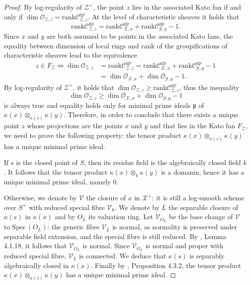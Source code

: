 \documentclass{amsart}%
\numberwithin{equation}{subsection}
\theoremstyle{plain2}
\theoremstyle{definition2}
\theoremstyle{stepstyle}
\theoremstyle{point}
\theoremstyle{subpoint}
\newcommand{\cX}{\ensuremath{\mathscr{X}}}
\newcommand{\fp}{\ensuremath{\mathfrak{p}}}
\newcommand{\caC}{\ensuremath{\mathcal{C}}}
\newcommand{\caO}{\ensuremath{\mathcal{O}}}
\newcommand{\cY}{\ensuremath{\mathscr{Y}}}
\newcommand{\cZ}{\ensuremath{\mathscr{Z}}}
\renewcommand{\cZ}{\ensuremath{\mathscr{Z}}}
\renewcommand{\cY}{\ensuremath{\mathscr{Y}}}
\newcommand{\Spec}{\ensuremath{\mathrm{Spec}\,}}
\newcommand{\rank}{\mathrm{rank}}
\begin{document}
\begin{proof}
By log-regularity of $\cZ^+$, the point $z$ lies in the associated Kato fan if and only if $\dim \caO_{\cZ,z}= \rank \caC_{\cZ,z}^{\text{gp}}$. At the level of characteristic sheaves it holds that $$\rank \caC_{\cZ,z}^{\text{gp}}= \rank \caC_{\cX,x}^{\text{gp}} + \rank \caC_{\cY,y}^{\text{gp}} - 1.$$ Since $x$ and $y$ are both assumed to be points in the associated Kato fans, the equality between dimension of local rings and rank of the groupifications of characteristic sheaves lead to the equivalence \begin{align*}
z \in F_{\cZ}  \Leftrightarrow \dim \caO_{\cZ,z} & = \rank \caC_{\cZ,z}^{\text{gp}} = \rank \caC_{\cX,x}^{\text{gp}} + \rank \caC_{\cY,y}^{\text{gp}} - 1 \\
& = \dim \caO_{\cX,x} +  \dim \caO_{\cY,y} -1.
\end{align*}
By log-regularity of $\cZ^+$, it holds that $\dim \caO_{\cZ,z} \geqslant \rank \caC_{\cZ,z}^{\text{gp}}$, thus the inequality $$\dim \caO_{\cZ,z} \geqslant \dim \caO_{\cX,x} +  \dim \caO_{\cY,y} -1$$ is always true and equality holds only for minimal prime ideals $\fp$ of $\kappa(x) \otimes_{\kappa(s)} \kappa(y)$. Therefore, in order to conclude that there exists a unique point $z$ whose projections are the points $x$ and $y$ and that lies in the Kato fan $F_{\cZ}$, we need to prove the following property: the tensor product $\kappa(x) \otimes_{\kappa(s)} \kappa(y)$ has a unique minimal prime ideal. 

If $s$ is the closed point of $S$, then its residue field is the algebraically closed field $k$. It follows that the tensor product $\kappa(x) \otimes_{k} \kappa(y)$ is a domanin, hence it has a unique minimal prime ideal, namely $0$. 

Otherwise, we denote by $\mathscr{V}$ the closure of $x$ in $\cX^+$: it is still a log-smooth scheme over $S^+$ with reduced special fibre $\mathscr{V}_k$. We denote by $L$ the separable closure of $\kappa(s)$ in $\kappa(x)$ and by $O_L$ its valuation ring. Let $\mathscr{V}_{O_L}$ be the base change of $\mathscr{V}$ to $\Spec(O_L)$: the generic fibre $\mathscr{V}_L$ is normal, as normality is preserved under separable field extension,
and the special fibre is still reduced. By \cite{Liu2002}, Lemma 4.1.18, it follows that $\mathscr{V}_{O_L}$ is normal. Since $\mathscr{V}_{O_L}$ is normal and proper with reduced special fibre, $\mathscr{V}_L$ is connected.
We deduce that $\kappa(s)$ is separably algebraically closed in $\kappa(x)$. Finally by \cite{DieudonneGrothendieck}, Proposition 4.3.2, the tensor product $\kappa(x) \otimes_{\kappa(s)} \kappa(y)$ has a unique minimal prime ideal.
\end{proof}
\end{document}
